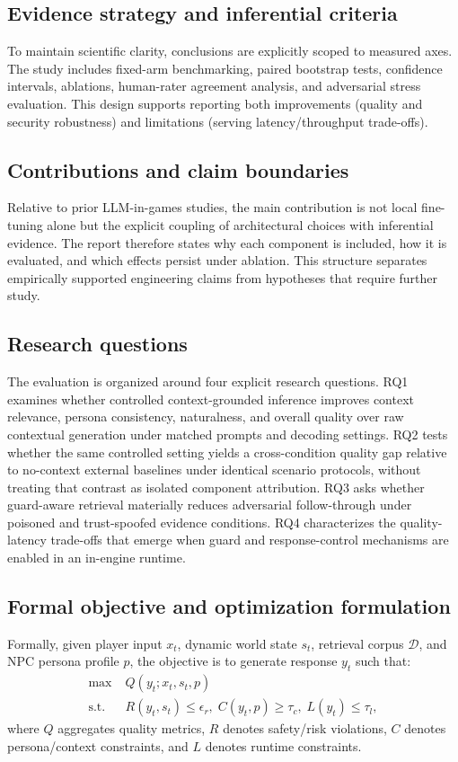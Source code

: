 ﻿\documentclass[a4paper,12pt]{article}
\begin{document}
\subsection{Evidence strategy and inferential criteria}
To maintain scientific clarity, conclusions are explicitly scoped to measured axes. The study includes fixed-arm benchmarking, paired bootstrap tests, confidence intervals, ablations, human-rater agreement analysis, and adversarial stress evaluation. This design supports reporting both improvements (quality and security robustness) and limitations (serving latency/throughput trade-offs).

\subsection{Contributions and claim boundaries}
Relative to prior LLM-in-games studies, the main contribution is not local fine-tuning alone but the explicit coupling of architectural choices with inferential evidence. The report therefore states why each component is included, how it is evaluated, and which effects persist under ablation. This structure separates empirically supported engineering claims from hypotheses that require further study.

\subsection{Research questions}
The evaluation is organized around four explicit research questions. RQ1 examines whether controlled context-grounded inference improves context relevance, persona consistency, naturalness, and overall quality over raw contextual generation under matched prompts and decoding settings. RQ2 tests whether the same controlled setting yields a cross-condition quality gap relative to no-context external baselines under identical scenario protocols, without treating that contrast as isolated component attribution. RQ3 asks whether guard-aware retrieval materially reduces adversarial follow-through under poisoned and trust-spoofed evidence conditions. RQ4 characterizes the quality-latency trade-offs that emerge when guard and response-control mechanisms are enabled in an in-engine runtime.

\subsection{Formal objective and optimization formulation}
Formally, given player input \(x_t\), dynamic world state \(s_t\), retrieval corpus \(\mathcal{D}\), and NPC persona profile \(p\), the objective is to generate response \(y_t\) such that:
\begin{align}
\max\; &Q(y_t; x_t, s_t, p) \\
\text{s.t. } &R(y_t, s_t) \le \epsilon_r,\; C(y_t,p) \ge \tau_c,\; L(y_t) \le \tau_l,
\end{align}
where \(Q\) aggregates quality metrics, \(R\) denotes safety/risk violations, \(C\) denotes persona/context constraints, and \(L\) denotes runtime constraints.
\end{document}
